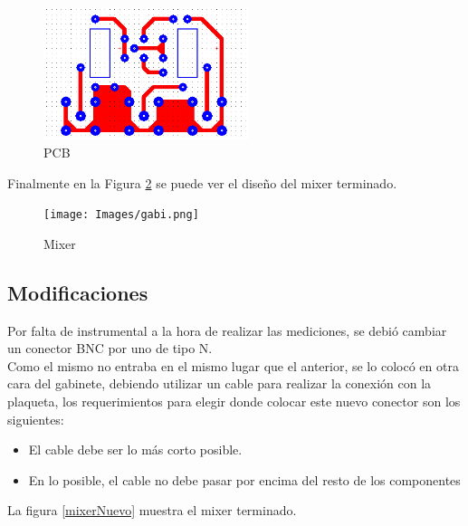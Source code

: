 \documentclass[a4paper,10pt]{article}
\begin{document}
	\begin{figure}[!htb]
		\centering
		\includegraphics[width=6cm]{Images/PCB.png}
		\caption{PCB}
		\label{pcb}
	\end{figure}
	
	\indent Finalmente en la Figura \ref{ecuadorputa} se puede ver el dise\~no 
	del mixer terminado. 
	
	\begin{figure}[!htb]
		\centering
		\texttt{[image: Images/gabi.png]}
		\caption{Mixer}
		\label{ecuadorputa}
	\end{figure}
	
	\subsection{Modificaciones}
	\indent Por falta de instrumental a la hora de realizar las mediciones, se 
	debió cambiar un conector BNC por uno de tipo N. \\
	\indent Como el mismo no entraba en el mismo lugar que el anterior, se lo 
	colocó en otra cara del gabinete, debiendo utilizar un cable para realizar 
	la conexión con la plaqueta, los requerimientos para elegir donde colocar 
	este nuevo conector son los siguientes:
	
	\begin{itemize}
		\item El cable debe ser lo más corto posible.
		\item En lo posible, el cable no debe pasar por encima del resto de los 
		componentes
	\end{itemize}

	\indent La figura \ref{mixerNuevo} muestra el mixer terminado.
\end{document}
